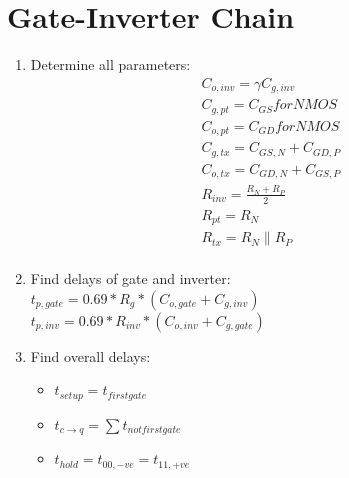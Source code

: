 \documentclass[twocolumn,8pt]{extarticle}
\begin{document}
\section*{Gate-Inverter Chain}
\begin{enumerate} \setlength{\itemsep}{0pt}
    \item Determine all parameters:
          \begin{align*}
              C_{o,inv} = \gamma C_{g,inv} \\
              C_{g,pt} = C_{GS} for NMOS   \\
              C_{o,pt} = C_{GD} for NMOS   \\
              C_{g,tx} = C_{GS,N}+C_{GD,P} \\
              C_{o,tx} = C_{GD,N}+C_{GS,P} \\
              R_{inv} = \frac{R_N+R_P}{2}  \\
              R_{pt} = R_N                 \\
              R_{tx} = R_N \parallel R_P   \\
          \end{align*}
    \item Find delays of gate and inverter:\\ $t_{p,gate} =
              0.69*R_g*(C_{o,gate}+C_{g,inv})$\\ $t_{p,inv} =
              0.69*R_{inv}*(C_{o,inv}+C_{g,gate})$
    \item Find overall delays:
          \begin{itemize}\setlength{\itemsep}{0pt}
              \item $t_{setup} = t_{firstgate}$
              \item $t_{c\rightarrow q} = \sum t_{notfirstgate}$
              \item $t_{hold} = t_{00,-ve} = t_{11,+ve}$
          \end{itemize}
\end{enumerate}
\end{document}
